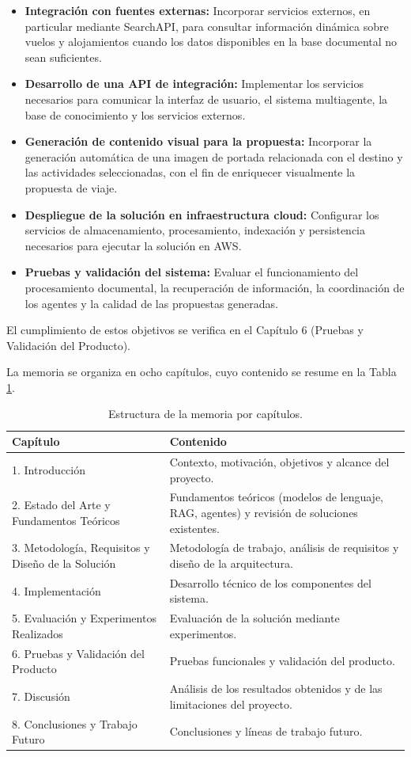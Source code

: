 \begin{itemize}
\item \textbf{Integración con fuentes externas:} Incorporar servicios externos, en particular mediante SearchAPI, para consultar información dinámica sobre vuelos y alojamientos cuando los datos disponibles en la base documental no sean suficientes.
\item \textbf{Desarrollo de una API de integración:} Implementar los servicios necesarios para comunicar la interfaz de usuario, el sistema multiagente, la base de conocimiento y los servicios externos.
\item \textbf{Generación de contenido visual para la propuesta:} Incorporar la generación automática de una imagen de portada relacionada con el destino y las actividades seleccionadas, con el fin de enriquecer visualmente la propuesta de viaje.
\item \textbf{Despliegue de la solución en infraestructura cloud:} Configurar los servicios de almacenamiento, procesamiento, indexación y persistencia necesarios para ejecutar la solución en AWS.
\item \textbf{Pruebas y validación del sistema:} Evaluar el funcionamiento del procesamiento documental, la recuperación de información, la coordinación de los agentes y la calidad de las propuestas generadas.
\end{itemize}

El cumplimiento de estos objetivos se verifica en el Capítulo 6 (Pruebas y Validación del Producto).

La memoria se organiza en ocho capítulos, cuyo contenido se resume en la Tabla \ref{tab:estructura}.

\begin{table}[H]
\centering
\begin{tabular}{@{}p{4.5cm}p{9cm}@{}}
\toprule
\textbf{Capítulo} & \textbf{Contenido} \\
\midrule
1. Introducción & Contexto, motivación, objetivos y alcance del proyecto. \\
2. Estado del Arte y Fundamentos Teóricos & Fundamentos teóricos (modelos de lenguaje, RAG, agentes) y revisión de soluciones existentes. \\
3. Metodología, Requisitos y Diseño de la Solución & Metodología de trabajo, análisis de requisitos y diseño de la arquitectura. \\
4. Implementación & Desarrollo técnico de los componentes del sistema. \\
5. Evaluación y Experimentos Realizados & Evaluación de la solución mediante experimentos. \\
6. Pruebas y Validación del Producto & Pruebas funcionales y validación del producto. \\
7. Discusión & Análisis de los resultados obtenidos y de las limitaciones del proyecto. \\
8. Conclusiones y Trabajo Futuro & Conclusiones y líneas de trabajo futuro. \\
\bottomrule
\end{tabular}
\caption{Estructura de la memoria por capítulos.}
\label{tab:estructura}
\end{table}


